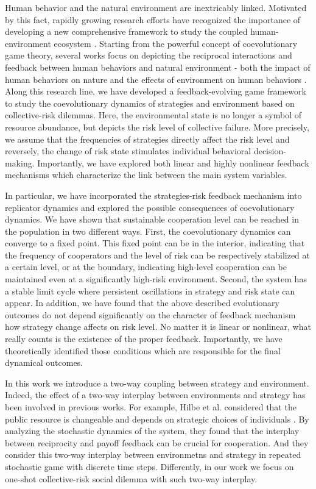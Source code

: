 \documentclass[9pt]{elife}
\begin{document}
Human behavior and the natural environment are inextricably linked. Motivated by this fact, rapidly growing research efforts have recognized the importance of developing a new comprehensive framework to study the coupled human-environment ecosystem \citep{stern1993second,liu2007complexity,farahbakhsh2022modelling}. Starting from the powerful concept of coevolutionary game theory, several works focus on depicting the reciprocal interactions and feedback between human behaviors and natural environment - both the impact of human behaviors on nature and the effects of environment on human behaviors \citep{weitz2016oscillating,chen2018punishment,tilman2020evolutionary}. Along this research line, we have developed a feedback-evolving game framework to study the coevolutionary dynamics of strategies and environment based on collective-risk dilemmas. Here, the environmental state is no longer a symbol of resource abundance, but depicts the risk level of collective failure. More precisely, we assume that the frequencies of strategies directly affect the risk level and reversely, the change of risk state stimulates individual behavioral decision-making. Importantly, we have explored both linear and highly nonlinear feedback mechanisms which characterize the link between the main system variables.

In particular, we have incorporated the strategies-risk feedback mechanism into replicator dynamics and explored the possible consequences of coevolutionary dynamics. We have shown that sustainable cooperation level can be reached in the population in two different ways. First, the coevolutionary dynamics can converge to a fixed point. This fixed point can be in the interior, indicating that the frequency of cooperators and the level of risk can be respectively stabilized at a certain level, or at the boundary, indicating high-level cooperation can be maintained even at a significantly high-risk environment. Second, the system has a stable limit cycle where persistent oscillations in strategy and risk state can appear. In addition, we have found that the above described evolutionary outcomes do not depend significantly on the character of feedback mechanism how strategy change affects on risk level. No matter it is linear or nonlinear, what really counts is the existence of the proper feedback. Importantly, we have theoretically identified those conditions which are responsible for the final dynamical outcomes.

In this work we introduce a two-way coupling between strategy and environment. Indeed, the effect of a two-way interplay between environments and strategy has been involved in previous works. For example, Hilbe et al. considered that the public resource is changeable and depends on strategic choices of individuals \citep{hilbe2018evolution}. By analyzing the stochastic dynamics of the system, they found that the interplay between reciprocity and payoff feedback can be crucial for cooperation. And they consider this two-way interplay between environmetns and strategy in repeated stochastic game with discrete time steps. Differently, in our work we focus on one-shot collective-risk social dilemma with such two-way interplay. 
\end{document}
